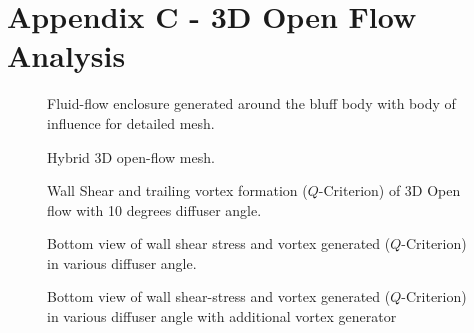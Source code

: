 \newpage
\section*{Appendix C - 3D Open Flow Analysis} 

\begin{figure}[!htb]
    \centering
    \noindent{}
    \caption{Fluid-flow enclosure generated around the bluff body with body of influence for detailed mesh.}
    \label{fig:3D_OF_FLOWFIELD}
\end{figure}

\begin{figure}[!htb]
    \centering
    \noindent{}
    \caption{Hybrid 3D open-flow mesh.}
    \label{fig:3D_OF_MESH}
\end{figure}

\begin{figure}[!htb]
    \centering
    \noindent{}
    \caption{Wall Shear and trailing vortex formation ($Q$-Criterion) of 3D Open flow with 10 degrees diffuser angle.}
    \label{fig:3D_OF_ISO_COMPARE}
\end{figure}
\begin{figure}
    \centering
    \noindent{}
    \caption{Bottom view of wall shear stress and vortex generated ($Q$-Criterion) in various diffuser angle.}
    \label{fig:3D_OF_BOTTOM_VIEW_COMPARE_DIFF}
\end{figure}

\begin{figure}
    \centering
    \noindent{}
    \caption{Bottom view of wall shear-stress and vortex generated ($Q$-Criterion) in various diffuser angle with additional vortex generator}
    \label{fig:3D_OF_BOTTOM_VIEW_COMPARE_DIFF_F}
\end{figure}

\begin{figure}
    \centering
    \noindent{}
    \label{fig:3D_OF_BOTTOM_VIEW_COMPARE_DIFF_IN}
\end{figure}